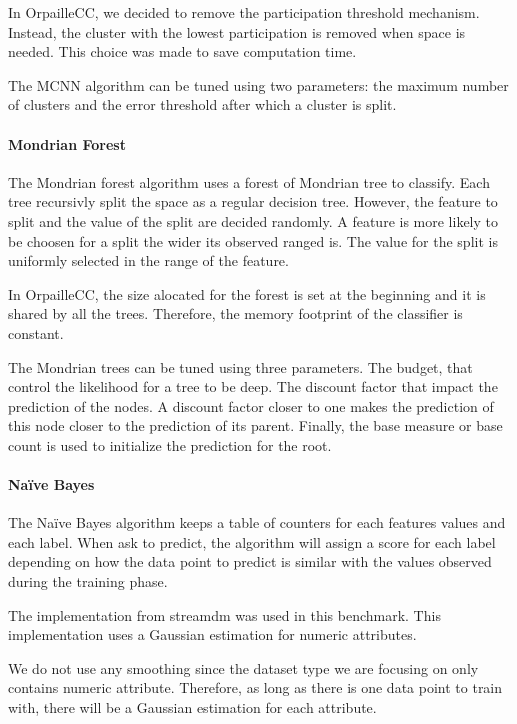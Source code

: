In OrpailleCC, we decided to remove the
participation threshold mechanism.  Instead, the
cluster with the lowest participation is removed
when space is needed. This choice was made to save
computation time.

The MCNN algorithm can be tuned using two
parameters: the maximum number of clusters and the
error threshold after which a cluster is split.


\paragraph{Mondrian Forest~\cite{mondrian2014}}
The Mondrian forest algorithm uses a forest of Mondrian tree to classify. Each
tree recursivly split the space as a regular decision tree. However, the
feature to split and the value of the split are decided randomly. A feature is
more likely to be choosen for a split the wider its observed ranged is. The
value for the split is uniformly selected in the range of the feature.

In OrpailleCC, the size alocated for the forest is set at the beginning and it
is shared by all the trees.  Therefore, the memory footprint of the classifier
is constant.

The Mondrian trees can be tuned using three parameters. The budget, that
control the likelihood for a tree to be deep.  The discount factor that impact
the prediction of the nodes. A discount factor closer to one makes the
prediction of this node closer to the prediction of its parent. Finally, the
base measure or base count is used to initialize the prediction for the root.

\paragraph{Naïve Bayes~\cite{naive_bayes}}
The Naïve Bayes algorithm keeps a table of counters for each features values
and each label. When ask to predict, the algorithm will assign a score for each
label depending on how the data point to predict is similar with the values
observed during the training phase.

The implementation from streamdm was used in this benchmark. This
implementation uses a Gaussian estimation for numeric attributes.

We do not use any smoothing since the dataset type we are focusing on only
contains numeric attribute. Therefore, as long as there is one data point to
train with, there will be a Gaussian estimation for each attribute.

